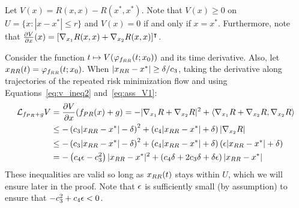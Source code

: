 
Let $V(x) = R(x,x) - R(x^*,x^*)$. Note that $V(x) \ge 0$ on $U = \{ x : |x - x^*| \le r \}$ and $V(x) = 0$ if and only if $x = x^*$. Furthermore, note that $\frac{\partial V}{\partial x}(x) = [\nabla_{x_1}R(x,x) + \nabla_{x_2}R(x,x)]^\intercal$.

Consider the function $t \mapsto V(\varphi_{f_{RR}}(t;x_0))$ and its time derivative. Also, let $x_{RR}(t) = \varphi_{f_{RR}}(t;x_0)$. 
When $|x_{RR}-x^*| \ge \delta/c_3$, taking the derivative along trajectories of the repeated risk minimization flow and using Equations~\eqref{eq:v_ineq2} and~\eqref{eq:ass_V1}:
\[
\begin{aligned}
    \mathcal{L}_{f_{PR} + g}V 
    &=
    \frac{\partial V}{\partial x} (f_{PR}(x) + g) 
    =
    -|\nabla_{x_1}R + \nabla_{x_2}R|^2 + \langle \nabla_{x_1}R + \nabla_{x_2}R, \nabla_{x_2}R \rangle \\
    &\le
    -\left( c_3 |x_{RR}-x^*|-\delta \right)^2
    +
    \left( c_4 |x_{RR}-x^*|+\delta \right) |\nabla_{x_2}R| \\
    &\le
    -\left( c_3 |x_{RR}-x^*|-\delta \right)^2
    +
    \left( c_4 |x_{RR}-x^*|+\delta \right) (\epsilon|x_{RR}-x^*|+\delta)\\
    &=
    -\left(c_4\epsilon-c_3^2\right)|x_{RR}-x^*|^2
    +\left(c_4\delta + 2c_3\delta+\delta\epsilon\right)|x_{RR}-x^*|
\end{aligned}
\]
These inequalities are valid so long as $x_{RR}(t)$ stays within $U$, which we will ensure later in the proof. Note that $\epsilon$ is sufficiently small (by assumption) to ensure that $-c_3^2 + c_4 \epsilon < 0$.

